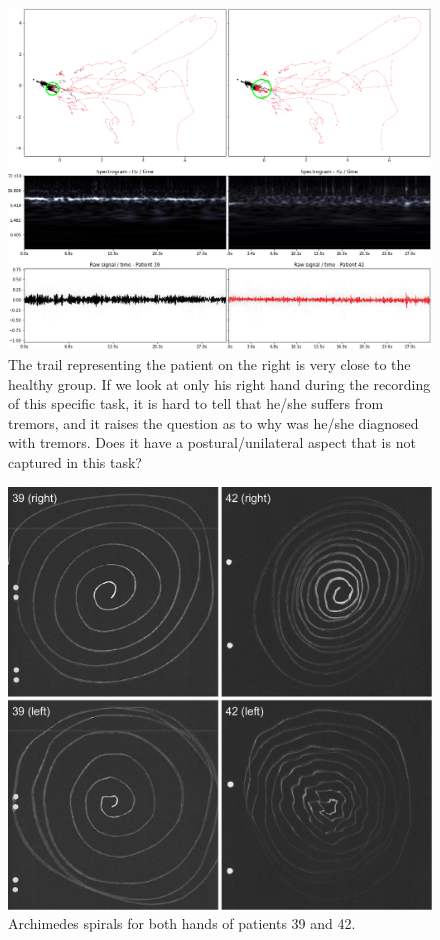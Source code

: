 \begin{figure}[ht]
\centering
\includegraphics[width=\linewidth]{figures/nemo/exp1-3942.png}
\caption{The trail representing the patient on the right is very close to the healthy group. If we look at only his right hand during the recording of this specific task, it is hard to tell that he/she suffers from tremors, and it raises the question as to why was he/she diagnosed with tremors. Does it have a postural/unilateral aspect that is not captured in this task? }
\label{fig:exp1-3942}
\end{figure}

\begin{figure}[ht]
\centering
\includegraphics[width=.7\linewidth]{figures/nemo/4-spirals.pdf}
\caption{Archimedes spirals for both hands of patients 39 and 42.}
\label{fig:spirals}
\end{figure}
    
